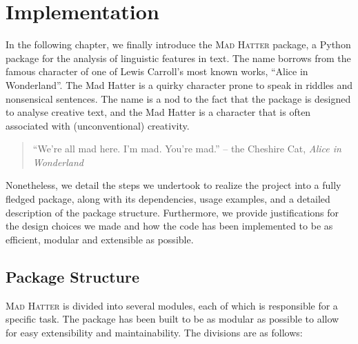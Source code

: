 \chapter{Implementation}
\label{sec:implementation}
In the following chapter, we finally introduce the \textsc{Mad Hatter} package, a Python package for the analysis of linguistic features in text. The name borrows from the famous character of one of Lewis Carroll's most known works, ``Alice in Wonderland''. The Mad Hatter is a quirky character prone to speak in riddles and nonsensical sentences. The name is a nod to the fact that the package is designed to analyse creative text, and the Mad Hatter is a character that is often associated with (unconventional) creativity. 

\begin{quote}
    ``We're all mad here. I'm mad. You're mad.'' -- the Cheshire Cat, \textit{Alice in Wonderland}
\end{quote}

Nonetheless, we detail the steps we undertook to realize the project into a fully fledged package, along with its dependencies, usage examples, and a detailed description of the package structure. Furthermore, we provide justifications for the design choices we made and how the code has been implemented to be as efficient, modular and extensible as possible. 

\section{Package Structure}

\textsc{Mad Hatter} is divided into several modules, each of which is responsible for a specific task. The package has been built to be as modular as possible to allow for easy extensibility and maintainability. The divisions are as follows:

